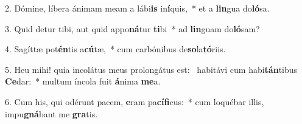 2. Dómine, líbera ánimam meam a lábi\textbf{is} in\textbf{í}quis,~*  et a \textbf{lin}gua do\textbf{ló}sa.\

3. Quid detur tibi, aut quid appo\textbf{ná}tur \textbf{ti}bi~*  ad \textbf{lin}guam do\textbf{ló}sam?\

4. Sagíttæ pot\textbf{én}tis a\textbf{cú}tæ,~*  cum carbónibus de\textbf{so}la\textbf{tó}riis.\

5. Heu mihi! quia incolátus meus prolongátus est: \dag\  habitávi cum habi\textbf{tán}tibus \textbf{Ce}dar:~*  multum íncola fuit \textbf{á}nima \textbf{me}a.\

6. Cum his, qui odérunt pacem, \textbf{e}ram pa\textbf{cí}\textbf{fi}cus:~*  cum loquébar illis, impu\textbf{gná}bant me \textbf{gra}tis.\

